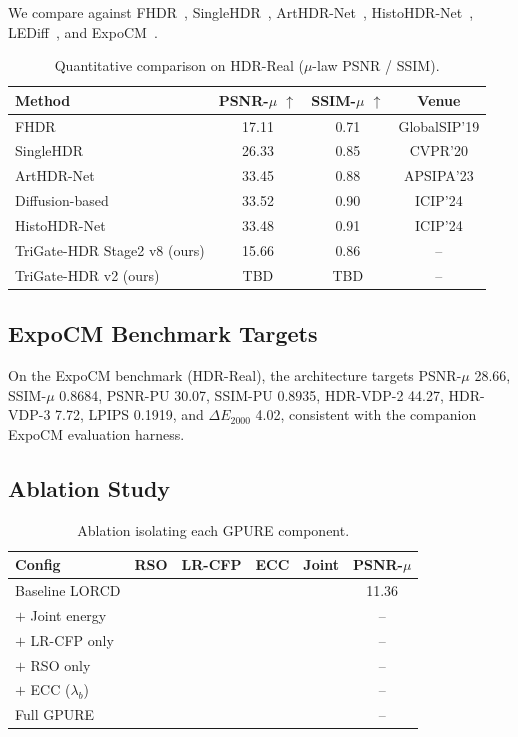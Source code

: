 \documentclass[10pt,twocolumn,letterpaper]{article}
\newcommand{\cmark}{\ding{51}}
\newcommand{\xmark}{\ding{55}}
\begin{document}
We compare against FHDR~\cite{fhdr}, SingleHDR~\cite{singlehdr}, ArtHDR-Net~\cite{arthdr}, HistoHDR-Net~\cite{histohdr}, LEDiff~\cite{lediff}, and ExpoCM~\cite{expocm}.

\begin{table}[t]
\centering
\small
\caption{Quantitative comparison on HDR-Real ($\mu$-law PSNR / SSIM).}
\label{tab:main-results}
\begin{tabular}{lccc}
\toprule
Method & PSNR-$\mu$ $\uparrow$ & SSIM-$\mu$ $\uparrow$ & Venue \\
\midrule
FHDR~\cite{fhdr} & 17.11 & 0.71 & GlobalSIP'19 \\
SingleHDR~\cite{singlehdr} & 26.33 & 0.85 & CVPR'20 \\
ArtHDR-Net~\cite{arthdr} & 33.45 & 0.88 & APSIPA'23 \\
Diffusion-based~\cite{histohdr} & 33.52 & 0.90 & ICIP'24 \\
HistoHDR-Net~\cite{histohdr} & 33.48 & 0.91 & ICIP'24 \\
TriGate-HDR Stage2 v8 (ours) & 15.66 & 0.86 & -- \\
TriGate-HDR v2 (ours) & TBD & TBD & -- \\
\bottomrule
\end{tabular}
\end{table}

\subsection{ExpoCM Benchmark Targets}

On the ExpoCM benchmark (HDR-Real), the architecture targets PSNR-$\mu$ 28.66, SSIM-$\mu$ 0.8684, PSNR-PU 30.07, SSIM-PU 0.8935, HDR-VDP-2 44.27, HDR-VDP-3 7.72, LPIPS 0.1919, and $\Delta E_{2000}$ 4.02, consistent with the companion ExpoCM evaluation harness.

\subsection{Ablation Study}

\begin{table}[t]
\centering
\small
\caption{Ablation isolating each GPURE component.}
\label{tab:ablation}
\begin{tabular}{lccccc}
\toprule
Config & RSO & LR-CFP & ECC & Joint & PSNR-$\mu$ \\
\midrule
Baseline LORCD & \xmark & \xmark & \xmark & \xmark & 11.36 \\
$+$ Joint energy & \xmark & \xmark & \xmark & \cmark & -- \\
$+$ LR-CFP only & \xmark & \cmark & \xmark & \cmark & -- \\
$+$ RSO only & \cmark & \xmark & \xmark & \cmark & -- \\
$+$ ECC ($\lambda_b$) & \xmark & \xmark & \cmark & \cmark & -- \\
Full GPURE & \cmark & \cmark & \cmark & \cmark & -- \\
\bottomrule
\end{tabular}
\end{table}
\end{document}
